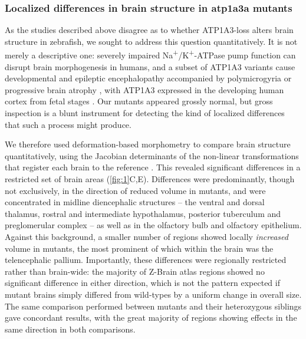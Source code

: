 \documentclass[9.5pt,lineno]{RandlettLab_elife}
\begin{document}
\subsubsection{Localized differences in brain structure in atp1a3a mutants}

As the studies described above disagree as to whether ATP1A3-loss alters brain structure in zebrafish, we sought to address this question quantitatively.
It is not merely a descriptive one: severely impaired Na\textsuperscript{+}/K\textsuperscript{+}-ATPase pump function can disrupt brain morphogenesis in humans, and a subset of ATP1A3 variants cause developmental and epileptic encephalopathy accompanied by polymicrogyria or progressive brain atrophy \citep{Vetro2021}, with ATP1A3 expressed in the developing human cortex from fetal stages \citep{Smith2021}.
Our mutants appeared grossly normal, but gross inspection is a blunt instrument for detecting the kind of localized differences that such a process might produce.

We therefore used deformation-based morphometry to compare brain structure quantitatively, using the Jacobian determinants of the non-linear transformations that register each brain to the reference \citep{Randlett2015}.
This revealed significant differences in a restricted set of brain areas (\autoref{fig:1}C,E).
Differences were predominantly, though not exclusively, in the direction of reduced volume in mutants, and were concentrated in midline diencephalic structures -- the ventral and dorsal thalamus, rostral and intermediate hypothalamus, posterior tuberculum and preglomerular complex -- as well as in the olfactory bulb and olfactory epithelium.
Against this background, a smaller number of regions showed locally \emph{increased} volume in mutants, the most prominent of which within the brain was the telencephalic pallium.
Importantly, these differences were regionally restricted rather than brain-wide: the majority of Z-Brain atlas regions showed no significant difference in either direction, which is not the pattern expected if mutant brains simply differed from wild-types by a uniform change in overall size.
The same comparison performed between mutants and their heterozygous siblings gave concordant results, with the great majority of regions showing effects in the same direction in both comparisons.
\end{document}
